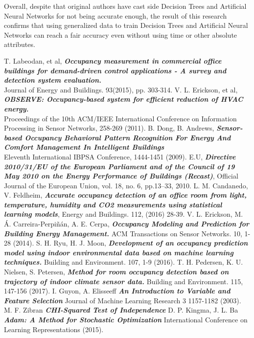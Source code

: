\documentclass[conference]{IEEEtran}
\begin{document}
Overall, despite that original authors have cast side Decision Trees and
Artificial Neural Networks for not being accurate enough, the result of this research confirms that using generalized data to train Decision Trees and Artificial
Neural Networks can reach a fair accuracy even without using time or other absolute
attributes.


\begin{thebibliography}{1}
T. Labeodan, et al, \emph{\textbf{Occupancy   measurement   in   commercial   office  
buildings   for   demand-driven   control   applications   -   A   survey   and   detection   system   evaluation.}}\\  
Journal of Energy and Buildings. 93(2015), pp. 303-314.
V. L. Erickson, et al,    \emph{\textbf{OBSERVE: Occupancy-based system for efficient reduction of HVAC energy.}}\\Proceedings   of   the   10th   ACM/IEEE   International   Conference  
on Information Processing in Sensor Networks, 258-269 (2011).
B.   Dong,   B.   Andrews, \emph{\textbf{Sensor-based   Occupancy   Behavioral   Pattern   Recognition   For   Energy  
And   Comfort   Management   In   Intelligent   Buildings}}\\Eleventh   International   IBPSA   Conference,  
1444-1451 (2009).
E.U, \emph{\textbf{Directive 2010/31/EU of the European Parliament and of the Council of 19
May 2010 on the Energy Performance of Buildings (Recast)}}, Official Journal of the
European Union, vol. 18, no. 6, pp.13–33, 2010.
L. M. Candanedo, V. Feldheim, \emph{\textbf{Accurate occupancy detection of an office room from light, temperature, humidity and CO2 measurements using statistical learning models}}, Energy and Buildings. 112, (2016) 28-39.
V. L. Erickson, M. Á. Carreira-Perpiñán, A. E. Cerpa, \emph{\textbf{Occupancy Modeling and Prediction for Building Energy Management.}} ACM Transactions on Sensor Networks. 10, 1-28 (2014).
S. H. Ryu, H. J. Moon, \emph{\textbf{Development of an occupancy prediction model using indoor environmental data based on machine learning techniques.}} Building and Environment. 107, 1-9 (2016).
T. H. Pedersen, K. U. Nielsen, S. Petersen, \emph{\textbf{Method for room occupancy detection based on trajectory of indoor climate sensor data.}} Building and Environment. 115, 147-156 (2017).
I. Guyon, A. Elisseeff  \emph{\textbf{An Introduction to Variable and Feature Selection}}
Journal of Machine Learning Research 3  1157-1182 (2003).
M. F. Zibran
\emph{\textbf{CHI-Squared Test of Independence}}
D. P. Kingma, J. L. Ba
\emph{\textbf{Adam: A Method for Stochastic Optimization }}
International Conference on Learning Representations (2015).
\end{thebibliography}




\end{document}
